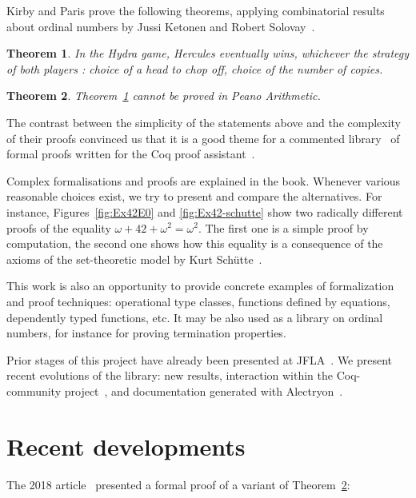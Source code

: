 \documentclass{easychair}
\newtheorem{theorem}{Theorem}
\newcommand{\coq}{Coq\xspace}
\newcommand{\community}{Coq-community\xspace}
\newcommand{\alectr}{Alectryon\xspace}
\begin{document}

Kirby and Paris prove the following theorems, applying
combinatorial results about ordinal numbers by Jussi Ketonen and Robert Solovay~\cite{KS81}.

\begin{theorem}
  In the Hydra game, Hercules eventually wins, whichever the strategy of both players :
  choice of a head to chop off, choice of the number of copies. 
 \label{kp:thm1}
\end{theorem}

\begin{theorem}
  Theorem~\ref{kp:thm1} cannot be proved in Peano Arithmetic. \label{kp:thm2}
\end{theorem}

The contrast between the simplicity of the statements above and the complexity of their proofs convinced us that it is a good theme for a commented library~\cite{HydraBattles} of formal proofs written for the \coq proof assistant~\cite{Coq}. 

Complex formalisations and proofs are explained in the book.
Whenever various reasonable choices exist, we try to present and compare the alternatives.
  For instance, Figures~\ref{fig:Ex42E0} and \ref{fig:Ex42-schutte} show two radically different proofs of the equality
  $\omega+42+\omega^2=\omega^2$. The first one is a simple proof by computation, the second one shows how this equality
  is a consequence of the axioms of the set-theoretic model  by Kurt Schütte~\cite{schutte}. 

This work is also an opportunity to 
 provide concrete examples of formalization and proof techniques: operational type classes, functions defined by  equations, dependently typed functions, etc. It may be also used as a library on ordinal numbers, for instance for proving termination properties.

 Prior stages of this project have already been presented at
 JFLA~\cite{PCiota, JFLA2018paper}.
We present recent evolutions of the library: new results, interaction within the \community project~\cite{CoqCommunity}, and documentation generated with \alectr~\cite{alectryonpaper, alectryongithub}.

\section{Recent developments}
The 2018 article~\cite{JFLA2018paper} presented a formal proof of  a variant of Theorem~\ref{kp:thm2}:
\end{document}
